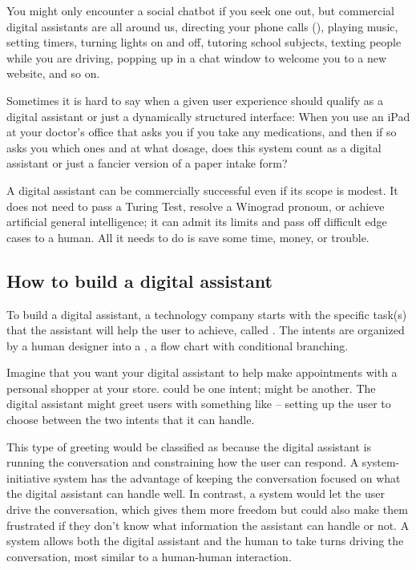 You might only encounter a social chatbot if you seek one out, but commercial digital assistants are all around us, directing your phone calls (), playing music, setting timers, turning lights on and off, tutoring school subjects, texting people while you are driving, popping up in a chat window to welcome you to a new website, and so on. 


Sometimes it is hard to say when a given user experience should qualify as a  digital assistant or just a dynamically structured interface: When you use an iPad at your doctor's office that asks you if you take any medications, and then if so asks you which ones and at what dosage, does this system count as a digital assistant or just a fancier version of a paper intake form? 

 A digital assistant can be commercially successful even if its scope is modest.  It does not need to pass a Turing Test, resolve a Winograd pronoun, or achieve artificial general intelligence; it can admit its limits and pass off difficult edge cases to a human.  All it needs to do is save some time, money, or trouble.


\subsection{How to build a digital assistant}

To build a digital assistant, a technology company starts with the specific task(s) that the assistant will help the user to achieve, called .   The intents are organized by a human designer into a , a flow chart with conditional branching.

Imagine that you want your digital assistant to help make appointments with a personal shopper at your store. 
 could be one intent;  might be another.  The digital assistant might greet users with something like  -- setting up the user to choose between the two intents that it can handle.  

This type of greeting would be classified as  because the digital assistant is running the conversation and constraining how the user can respond.  A system-initiative system has the advantage of keeping the conversation focused on what the digital assistant can handle well.  In contrast, a  system would  let the user drive the conversation, which gives them more freedom but could also make them frustrated if they don't know what information the assistant can handle or not.  A  system allows both the digital assistant and the human to take turns driving the conversation, most similar to a human-human interaction.

